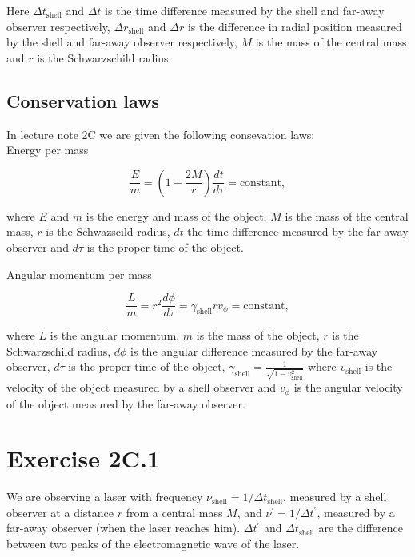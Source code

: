 \documentclass[a4paper,10pt,english]{article}
\begin{document}
Here $\Delta t_{\text{shell}}$ and $\Delta t$ is the time difference measured by the shell and far-away observer respectively, $\Delta r_{\text{shell}}$ and $\Delta r$ is the difference in radial position measured by the shell and far-away observer respectively, $M$ is the mass of the central mass and $r$ is the Schwarzschild radius.

\subsection*{Conservation laws}
In lecture note 2C we are given the following consevation laws:
\\
Energy per mass

\begin{equation}\label{eq:E/m}
\frac{E}{m}=\left(1-\frac{2M}{r}\right)\frac{dt}{d\tau}=\text{constant},
\end{equation}

where $E$ and $m$ is the energy and mass of the object, $M$ is the mass of the central mass, $r$ is the Schwazscild radius, $dt$ the time difference measured by the far-away observer and $d\tau$ is the proper time of the object.

Angular momentum per mass

\begin{equation}\label{eq:L/m}
\frac{L}{m}=r^{2}\frac{d\phi}{d\tau}=\gamma_{\text{shell}}rv_{\phi}=\text{constant},
\end{equation}

where $L$ is the angular momentum, $m$ is the mass of the object, $r$ is the Schwarzschild radius, $d\phi$ is the angular difference measured by the far-away observer, $d\tau$ is the proper time of the object, $\gamma_{\text{shell}}=\frac{1}{\sqrt{1-v_{\text{shell}}^{2}}}$ where $v_{\text{shell}}$ is the velocity of the object measured by a shell observer and $v_{\phi}$ is the angular velocity of the object measured by the far-away observer.

\newpage








\section*{Exercise 2C.1}


We are observing a laser with frequency $\nu_{\text{shell}}=1/\Delta t_\text{shell}$, measured by a shell observer at a distance $r$ from a central mass $M$, and $\nu^{\prime}=1/\Delta t^{\prime}$, measured by a far-away observer (when the laser reaches him). $\Delta t^{\prime}$ and $\Delta t_\text{shell}$ are the difference between two peaks of the electromagnetic wave of the laser.
\end{document}
